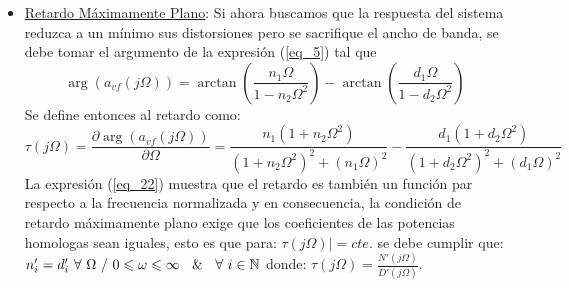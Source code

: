 \documentclass[12pt,a4paper]{article}
\begin{document}
\begin{itemize}
    
     \item \underline{Retardo Máximamente Plano}: Si ahora buscamos que la respuesta del sistema reduzca a un mínimo sus distorsiones pero se sacrifique el ancho de banda, se debe tomar el argumento de la expresión (\ref{eq_5}) tal que
    \begin{equation}
        \label{eq_21}
        \arg(a_{vf}(j\Omega))= \arctan\left(\frac{n_1 \Omega}{1 - n_2 \Omega^2}\right) - \arctan\left(\frac{d_1 \Omega}{1 - d_2 \Omega^2}\right)
    \end{equation}
    Se define entonces al retardo como:
    \begin{equation}
        \label{eq_22}
        \tau(j\Omega) = \frac{\partial \arg(a_{vf}(j\Omega))}{\partial \Omega} = \frac{n_1(1+n_2\Omega^2)}{(1+n_2\Omega^2)^2+(n_1\Omega)^2} - \frac{d_1(1+d_2\Omega^2)}{(1+d_2\Omega^2)^2+(d_1\Omega)^2} 
    \end{equation}
    La expresión (\ref{eq_22}) muestra que el retardo es también un función par respecto a la frecuencia normalizada y en consecuencia, la condición de retardo máximamente plano exige que los coeficientes de las potencias homologas sean iguales, esto es que para: $\tau(j\Omega)|=cte.$ se debe cumplir que: $n'_i = d'_i \ \forall \ \Omega \ / \ 0 \leqslant \omega \leqslant \infty \ \And \ \forall \ i\in \mathbb{N}$ donde: $\tau(j\Omega)=\frac{N'(j\Omega)}{D'(j\Omega)}$.


\end{itemize}
\end{document}
